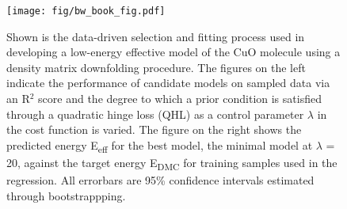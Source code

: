 \documentclass{article}
\begin{document}
\begin{figure}
	\begin{center}
    \texttt{[image: fig/bw\_book\_fig.pdf]}
  \end{center}
  \caption{Shown is the data-driven selection and fitting process used in developing a low-energy effective model of the CuO molecule using a density matrix downfolding procedure. The figures on the left indicate the performance of candidate models on sampled data via an R$^2$ score and the degree to which a prior condition is satisfied through a quadratic hinge loss (QHL) as a control parameter $\lambda$ in the cost function is varied. The figure on the right shows the predicted energy E\textsubscript{eff} for the best model, the minimal model at $\lambda$ = 20, against the target energy E\textsubscript{DMC} for training samples used in the regression. All errorbars are 95\% confidence intervals estimated through bootstrappping.}
\end{figure}
\end{document}
